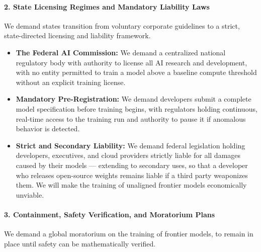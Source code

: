 \paragraph{2. State Licensing Regimes and Mandatory Liability
Laws}\label{state-licensing-regimes-and-mandatory-liability-laws}

We demand states transition from voluntary corporate guidelines to a
strict, state-directed licensing and liability framework.

\begin{itemize}
\tightlist
\item
  \textbf{The Federal AI Commission:} We demand a centralized national
  regulatory body with authority to license all AI research and
  development, with no entity permitted to train a model above a
  baseline compute threshold without an explicit training license.
\item
  \textbf{Mandatory Pre-Registration:} We demand developers submit a
  complete model specification before training begins, with regulators
  holding continuous, real-time access to the training run and authority
  to pause it if anomalous behavior is detected.
\item
  \textbf{Strict and Secondary Liability:} We demand federal legislation
  holding developers, executives, and cloud providers strictly liable
  for all damages caused by their models --- extending to secondary
  uses, so that a developer who releases open-source weights remains
  liable if a third party weaponizes them. We will make the training of
  unaligned frontier models economically unviable.
\end{itemize}

\paragraph{3. Containment, Safety Verification, and Moratorium
Plans}\label{containment-safety-verification-and-moratorium-plans}

We demand a global moratorium on the training of frontier models, to
remain in place until safety can be mathematically verified.

